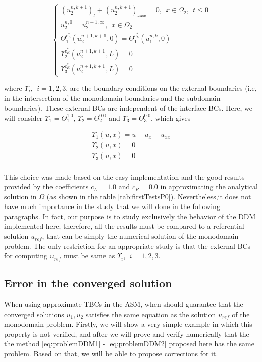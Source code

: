 \begin{equation}
    \label{eq:problemDDM2}
    \begin{cases}
        (u_2^{n,k+1})_t + (u_2^{n,k+1})_{xxx} = 0 , \ \ x \in \Omega_2, \ \ t \leq 0\\
        u_2^{n,0} = u_2^{n-1,\infty} , \ \ x \in \Omega_2 \\
        \Theta_1^{c_L^*}(u_2^{n+1,k+1},0) = \Theta_1^{c_L^*}(u_1^{n,k},0) \\
        \Upsilon_2^{c_R^*}(u_2^{n+1,k+1},L) = 0 \\
        \Upsilon_3^{c_R^*}(u_2^{n+1,k+1},L) = 0
     \end{cases}
\end{equation}

\indent where $ \Upsilon_i, \ \ i=1,2,3$, are the boundary conditions on the external boundaries (i.e, in the intersection of the monodomain boundaries and the subdomain boundaries). These external BCs are independent of the interface BCs. Here, we will consider $\Upsilon_1 = \Theta_1^{1.0}$, $\Upsilon_2 = \Theta_2^{0.0}$ and $\Upsilon_3 = \Theta_3^{0.0}$, which gives

\begin{gather}
	\Upsilon_1(u,x) = u - u_x + u_{xx} \\
	\Upsilon_2(u,x) = 0 \\
	\Upsilon_3(u,x) = 0 \\
\end{gather}

\indent This choice was made based on the easy implementation and the good results provided by the coefficients $c_L = 1.0$ and $c_R = 0.0$ in approximating the analytical solution in $\Omega$ (as shown in the table \ref{tab:firstTestsP0}). Nevertheless,it does not have much importance in the study that we will done in the following paragraphs. In fact, our purpose is to study exclusively the behavior of the DDM implemented here; therefore, all the results must be compared to a referential solution $u_{ref}$, that can be simply the numerical solution of the monodomain problem. The only restriction for an appropriate study is that the external BCs for computing $u_{ref}$ must be same as $\Upsilon_i, \ \ i=1,2,3$.


\subsection{Error in the converged solution}

\indent When using approximate TBCs in the ASM, when should guarantee that the converged solutions $u_1,u_2$ satisfies the same equation as the solution $u_{ref}$ of the monodomain problem. Firstly, we will show a very simple example in which this property is not verified, and after we will prove and verify numerically that the the method \eqref{eq:problemDDM1} - \eqref{eq:problemDDM2} proposed here has the same problem. Based on that, we will be able to propose corrections for it.

